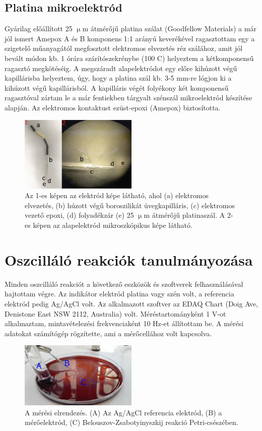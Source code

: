 \subsection{Platina mikroelektród}
Gyárilag előállított 25 $\upmu$m átmérőjű platina szálat (Goodfellow Materials) a már jól ismert Amepox A és B komponens 1:1 arányú keverékével ragasztottam egy a szigetelő műanyagától megfosztott elektromos elvezetés réz szálához, amit jól bevált módon kb. 1 órára szárítószekrénybe (100 \textdegree C) helyeztem a kétkomponensű ragasztó megkötéséig. A megszáradt alapelektródot egy előre kihúzott végű kapillárisba helyeztem, úgy, hogy a platina szál kb. 3-5 mm-re lógjon ki a kihúzott végű kapillárisból. A kapilláris végét folyékony két komponensű ragasztóval zártam le a már fentiekben tárgyalt szénszál mikroelektród készítése alapján. Az elektromos kontaktust ezüst-epoxi (Amepox) biztosította.
\begin{figure}[!h]
\centering
\includegraphics[width=0.5\textwidth]{img/platina.png}
\caption{Az 1-es képen az elektród képe látható, ahol (a) elektromos elvezetés, (b) húzott végű boroszilikát üvegkapilláris, (c) elektromos vezető epoxi, (d) folyadékzár  (e) 25 $\upmu$m átmérőjű platinaszál. A 2-es képen az alapelektród mikroszkópikus képe látható.}
\label{fig:ionophores}
\end{figure}


\section{Oszcilláló reakciók tanulmányozása} 

Minden oszcilláló reakciót a következő eszközök és szoftverek felhasználásával hajtottam végre. Az indikátor elektród platina vagy szén volt, a referencia elektród pedig Ag/AgCl volt. Az alkalmazott szoftver az EDAQ Chart (Doig Ave, Denistone East NSW 2112, Australia) volt. Méréstartományként 1 V-ot alkalmaztam, mintavételezési frekvenciaként 10 Hz-et állítottam be. A mérési adatokat számítógép rögzítette, ami a mérőcellához volt kapcsolva.

\begin{figure}[!h]
\centering
\includegraphics[width=0.5\textwidth]{img/setup.png}
\caption{A mérési elrendezés. (A) Az Ag/AgCl referencia elektród, (B) a mérőelektród, (C) Belouszov-Zsabotyinyszkij reakció Petri-csészében.}
\label{fig:setup}
\end{figure}


